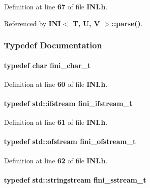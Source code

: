 Definition at line {\bf 67} of file {\bf I\+N\+I.\+h}.



Referenced by {\bf I\+N\+I$<$ T, U, V $>$\+::parse()}.



\subsubsection{Typedef Documentation}
\paragraph[{fini\+\_\+char\+\_\+t}]{\setlength{\rightskip}{0pt plus 5cm}typedef char {\bf fini\+\_\+char\+\_\+t}}\label{INI_8h_a03d482c4c241009c15ce537c9df118df}


Definition at line {\bf 60} of file {\bf I\+N\+I.\+h}.

\paragraph[{fini\+\_\+ifstream\+\_\+t}]{\setlength{\rightskip}{0pt plus 5cm}typedef std\+::ifstream {\bf fini\+\_\+ifstream\+\_\+t}}\label{INI_8h_a4ef7c81b8b39afcefa8dc81883126b5d}


Definition at line {\bf 61} of file {\bf I\+N\+I.\+h}.

\paragraph[{fini\+\_\+ofstream\+\_\+t}]{\setlength{\rightskip}{0pt plus 5cm}typedef std\+::ofstream {\bf fini\+\_\+ofstream\+\_\+t}}\label{INI_8h_af17079a3e2857b4b34fdb867fedb8874}


Definition at line {\bf 62} of file {\bf I\+N\+I.\+h}.

\paragraph[{fini\+\_\+sstream\+\_\+t}]{\setlength{\rightskip}{0pt plus 5cm}typedef std\+::stringstream {\bf fini\+\_\+sstream\+\_\+t}}\label{INI_8h_aff9f2d01dce7b38dcb4838bd5d1f84ed}


